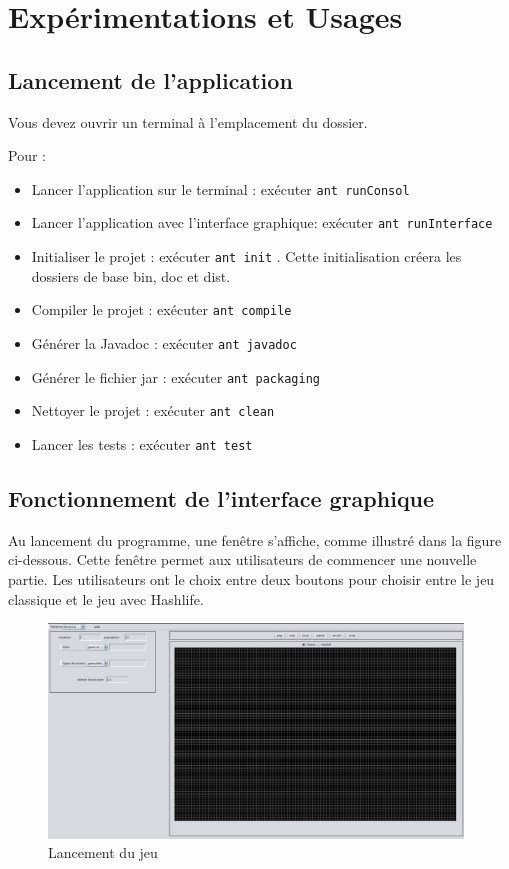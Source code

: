 \section{Expérimentations et Usages}
\subsection{Lancement de l'application}
Vous devez ouvrir un terminal à l'emplacement du dossier.

Pour :
\begin{itemize}
\item Lancer l'application sur le terminal : exécuter \verb|ant runConsol|
\item Lancer l'application avec l'interface graphique: exécuter \verb|ant runInterface|
\item Initialiser le projet : exécuter \verb|ant init| . Cette initialisation créera les dossiers de base bin, doc et dist.
\item Compiler le projet : exécuter \verb|ant compile| 
\item Générer la Javadoc : exécuter \verb|ant javadoc|
\item Générer le fichier jar : exécuter \verb|ant packaging|
\item Nettoyer le projet : exécuter \verb|ant clean|
\item Lancer les tests : exécuter \verb|ant test|
\end{itemize}

\subsection{Fonctionnement de l'interface graphique}
Au lancement du programme, une fenêtre s'affiche, comme illustré dans la figure ci-dessous. Cette fenêtre permet aux utilisateurs de commencer une nouvelle partie. Les utilisateurs ont le choix entre deux boutons pour choisir entre le jeu classique et le jeu avec Hashlife.

\begin{figure}[h]
\centering
\includegraphics[width=11cm]{images/image0.JPG}
\caption{Lancement du jeu}
\end{figure}

